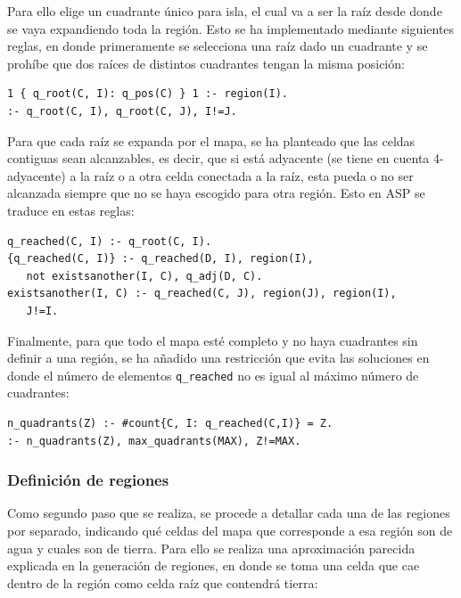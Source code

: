 Para ello elige un cuadrante único para isla, el cual va a ser la raíz desde donde se vaya expandiendo toda la región. Esto se ha implementado mediante siguientes reglas, en donde primeramente se selecciona una raíz dado un cuadrante y se prohíbe que dos raíces de distintos cuadrantes tengan la misma posición: \\

\begin{lstlisting}[label=lst:qroot]
1 { q_root(C, I): q_pos(C) } 1 :- region(I).
:- q_root(C, I), q_root(C, J), I!=J.
\end{lstlisting}

\hspace{1em}

Para que cada raíz se expanda por el mapa, se ha planteado que las celdas contiguas sean alcanzables, es decir, que si está adyacente (se tiene en cuenta 4-adyacente) a la raíz o a otra celda conectada a la raíz, esta pueda o no ser alcanzada siempre que no se haya escogido para otra región. Esto en ASP se traduce en estas reglas: \\

\begin{lstlisting}[label=lst:qreached]
q_reached(C, I) :- q_root(C, I).
{q_reached(C, I)} :- q_reached(D, I), region(I), 
   not existsanother(I, C), q_adj(D, C).
existsanother(I, C) :- q_reached(C, J), region(J), region(I),
   J!=I.
\end{lstlisting}

\hspace{1em}

Finalmente, para que todo el mapa esté completo y no haya cuadrantes sin definir a una región, se ha añadido una restricción que evita las soluciones en donde el número de elementos \texttt{q\_reached} no es igual al máximo número de cuadrantes: \\

\begin{lstlisting}[label=lst:qmax]
n_quadrants(Z) :- #count{C, I: q_reached(C,I)} = Z.
:- n_quadrants(Z), max_quadrants(MAX), Z!=MAX.
\end{lstlisting}

\subsubsection{Definición de regiones}
\label{subsubsec:cuadrantes}

Como segundo paso que se realiza, se procede a detallar cada una de las regiones por separado, indicando qué celdas del mapa que corresponde a esa región son de agua y cuales son de tierra. Para ello se realiza una aproximación parecida explicada en la generación de regiones, en donde se toma una celda que cae dentro de la región como celda raíz que contendrá tierra: \\

